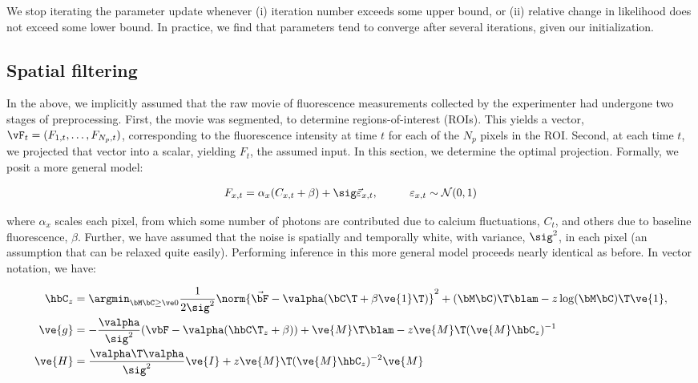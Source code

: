 We stop iterating the parameter update whenever (i) iteration number exceeds some upper bound, or (ii) relative change in likelihood does not exceed some lower bound.  In practice, we find that parameters tend to converge after several iterations, given our initialization. 


\subsection{Spatial filtering}

In the above, we implicitly assumed that the raw movie of fluorescence measurements collected by the experimenter had undergone two stages of preprocessing.  First, the movie was segmented, to determine regions-of-interest (ROIs).  This yields a vector, $\vF_t=(F_{1,t}, \ldots, F_{N_p,t})$, corresponding to the fluorescence intensity at time $t$ for each of the $N_p$ pixels in the ROI.  Second, at each time $t$, we projected that vector into a scalar, yielding $F_t$, the assumed input.  In this section, we determine the optimal projection.  Formally, we posit a more general model:

\begin{align} \label{eq:bF}
F_{x,t} &= \alpha_x (C_{x,t} + \beta) +  \sig \vec{\varepsilon}_{x,t}, \qquad &\varepsilon_{x,t} \sim \mathcal{N}(0,1)   
\end{align}

\noindent where $\alpha_x$ scales each pixel, from which some number of photons are contributed due to calcium fluctuations, $C_t$, and others due to baseline fluorescence, $\beta$.  Further, we have assumed that the noise is spatially and temporally white, with variance, $\sig^2$, in each pixel (an assumption that can be relaxed quite easily).  Performing inference in this more general model proceeds nearly identical as before. In vector notation, we have:

\begin{align} 
\hbC_{\zzz} 
&= \az  \frac{1}{2 \sig^2} \norm{\vec{\bF} - \valpha (\bC\T +\beta\ve{1}\T)}^2 + (\bM \bC )\T \blam  - \zzz \log(\bM \bC)\T\ve{1},  \label{eq:eta4}\\
\ve{g} &= -\frac{\valpha}{\sig^2}(\vbF -\valpha({\hbC\T}_{\zzz} + \beta)) + \ve{M}\T\blam - \zzz \ve{M}\T (\ve{M} \hbC_{\zzz})^{-1} \label{eq:g2} \\
\ve{H} &= \frac{\valpha\T \valpha}{\sig^2} \ve{I} + \zzz \ve{M}\T (\ve{M} \hbC_{\zzz})^{-2} \ve{M} \label{eq:H2}
\end{align}

